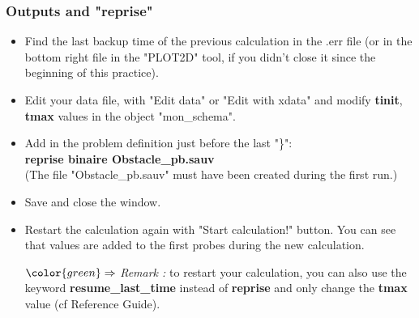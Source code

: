 \documentclass[10pt, hyperref={unicode=true,pdfusetitle, bookmarks=true,bookmarksnumbered=false,bookmarksopen=false, breaklinks=false,pdfborder={0 0 1},backref=true,colorlinks=true,linkcolor=darkblue,pageanchor}]{beamer}
\begin{document}
\begin{frame}
\frametitle{Outputs and "reprise"}
\begin{block}{}

\begin{itemize}
\item Find the last backup time of the previous calculation in the .err file (or in the bottom right file in the "PLOT2D" tool, if you didn't close it since the beginning of this practice).

\item \label{save_restart} Edit your data file, with "Edit data" or "Edit with xdata" and modify \textbf{tinit}, \textbf{tmax} values in the object "mon\_schema".

\item Add in the problem definition just before the last "\}":\\
\textbf{reprise binaire Obstacle\_pb.sauv}\\
(The file "Obstacle\_pb.sauv" must have been created during the first run.)

\item Save and close the window.

\item Restart the calculation again with "Start calculation!" button. You can see that values are added to the first probes during the new calculation.

\item [$\color{green}\Rightarrow$] \textit{Remark :} to restart your calculation, you can also use the keyword \textbf{resume\_last\_time} instead of \textbf{reprise} and only change the \textbf{tmax} value (cf Reference Guide).
\end{itemize}

\end{block}
\end{frame}
\end{document}
